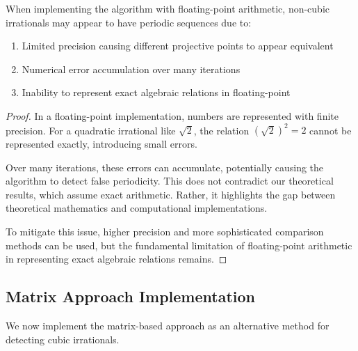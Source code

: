 \begin{proposition}
When implementing the \HAPD{} algorithm with floating-point arithmetic, non-cubic irrationals may appear to have periodic sequences due to:
\begin{enumerate}
    \item Limited precision causing different projective points to appear equivalent
    \item Numerical error accumulation over many iterations
    \item Inability to represent exact algebraic relations in floating-point
\end{enumerate}
\end{proposition}

\begin{proof}
In a floating-point implementation, numbers are represented with finite precision. For a quadratic irrational like $\sqrt{2}$, the relation $(\sqrt{2})^2 = 2$ cannot be represented exactly, introducing small errors.

Over many iterations, these errors can accumulate, potentially causing the algorithm to detect false periodicity. This does not contradict our theoretical results, which assume exact arithmetic. Rather, it highlights the gap between theoretical mathematics and computational implementations.

To mitigate this issue, higher precision and more sophisticated comparison methods can be used, but the fundamental limitation of floating-point arithmetic in representing exact algebraic relations remains.
\end{proof}

\subsection{Matrix Approach Implementation}

We now implement the matrix-based approach as an alternative method for detecting cubic irrationals.

